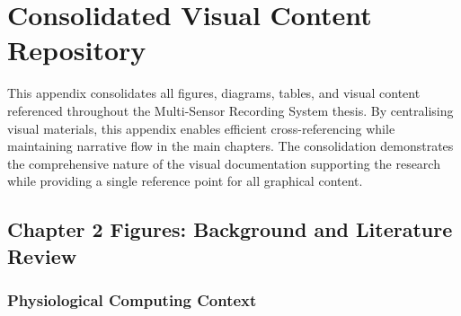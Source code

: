 \section{Consolidated Visual Content Repository}

This appendix consolidates all figures, diagrams, tables, and visual content referenced throughout the Multi-Sensor Recording System thesis. By centralising visual materials, this appendix enables efficient cross-referencing while maintaining narrative flow in the main chapters. The consolidation demonstrates the comprehensive nature of the visual documentation supporting the research while providing a single reference point for all graphical content.

\subsection{Chapter 2 Figures: Background and Literature Review}

\subsubsection{Physiological Computing Context}

